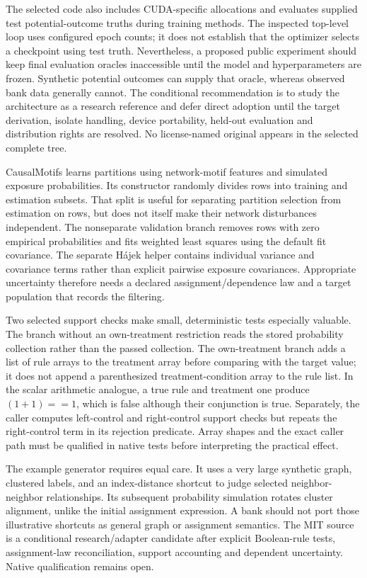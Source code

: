 The selected code also includes CUDA-specific allocations and evaluates supplied test potential-outcome truths during training methods. The inspected top-level loop uses configured epoch counts; it does not establish that the optimizer selects a checkpoint using test truth. Nevertheless, a proposed public experiment should keep final evaluation oracles inaccessible until the model and hyperparameters are frozen. Synthetic potential outcomes can supply that oracle, whereas observed bank data generally cannot. The conditional recommendation is to study the architecture as a research reference and defer direct adoption until the target derivation, isolate handling, device portability, held-out evaluation and distribution rights are resolved. No license-named original appears in the selected complete tree.\citep{exec25_pnet_targeted,exec25_pnet_choice}

CausalMotifs learns partitions using network-motif features and simulated exposure probabilities. Its constructor randomly divides rows into training and estimation subsets. That split is useful for separating partition selection from estimation on rows, but does not itself make their network disturbances independent. The nonseparate validation branch removes rows with zero empirical probabilities and fits weighted least squares using the default fit covariance. The separate H\'ajek helper contains individual variance and covariance terms rather than explicit pairwise exposure covariances. Appropriate uncertainty therefore needs a declared assignment/dependence law and a target population that records the filtering.\citep{exec25_pnet_motifs}

Two selected support checks make small, deterministic tests especially valuable. The branch without an own-treatment restriction reads the stored probability collection rather than the passed collection. The own-treatment branch adds a list of rule arrays to the treatment array before comparing with the target value; it does not append a parenthesized treatment-condition array to the rule list. In the scalar arithmetic analogue, a true rule and treatment one produce $(1+1)==1$, which is false although their conjunction is true. Separately, the caller computes left-control and right-control support checks but repeats the right-control term in its rejection predicate. Array shapes and the exact caller path must be qualified in native tests before interpreting the practical effect.\citep{exec25_pnet_motifs,exec25_pnet_choice}

The example generator requires equal care. It uses a very large synthetic graph, clustered labels, and an index-distance shortcut to judge selected neighbor-neighbor relationships. Its subsequent probability simulation rotates cluster alignment, unlike the initial assignment expression. A bank should not port those illustrative shortcuts as general graph or assignment semantics. The MIT source is a conditional research/adapter candidate after explicit Boolean-rule tests, assignment-law reconciliation, support accounting and dependent uncertainty. Native qualification remains open.\citep{exec25_pnet_motifs,exec25_pnet_choice}

